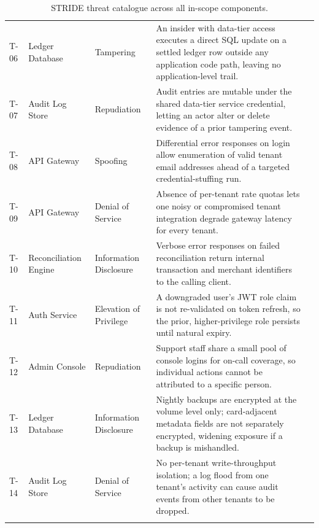 {\begin{longtable}{@{}P{7mm}P{25mm}P{22mm}P{68mm}c@{}}
T-06 & Ledger Database & Tampering & An insider with data-tier access executes a direct SQL update on a settled ledger row outside any application code path, leaving no application-level trail. & \critical{} \\
T-07 & Audit Log Store & Repudiation & Audit entries are mutable under the shared data-tier service credential, letting an actor alter or delete evidence of a prior tampering event. & \highrisk{} \\
T-08 & API Gateway & Spoofing & Differential error responses on login allow enumeration of valid tenant email addresses ahead of a targeted credential-stuffing run. & \lowrisk{} \\
T-09 & API Gateway & Denial of Service & Absence of per-tenant rate quotas lets one noisy or compromised tenant integration degrade gateway latency for every tenant. & \mediumrisk{} \\
T-10 & Reconciliation Engine & Information Disclosure & Verbose error responses on failed reconciliation return internal transaction and merchant identifiers to the calling client. & \lowrisk{} \\
T-11 & Auth Service & Elevation of Privilege & A downgraded user's JWT role claim is not re-validated on token refresh, so the prior, higher-privilege role persists until natural expiry. & \highrisk{} \\
T-12 & Admin Console & Repudiation & Support staff share a small pool of console logins for on-call coverage, so individual actions cannot be attributed to a specific person. & \mediumrisk{} \\
T-13 & Ledger Database & Information Disclosure & Nightly backups are encrypted at the volume level only; card-adjacent metadata fields are not separately encrypted, widening exposure if a backup is mishandled. & \highrisk{} \\
T-14 & Audit Log Store & Denial of Service & No per-tenant write-throughput isolation; a log flood from one tenant's activity can cause audit events from other tenants to be dropped. & \mediumrisk{} \\
\bottomrule
\caption{STRIDE threat catalogue across all in-scope components.}
\label{tab:stride}
\end{longtable}
}

